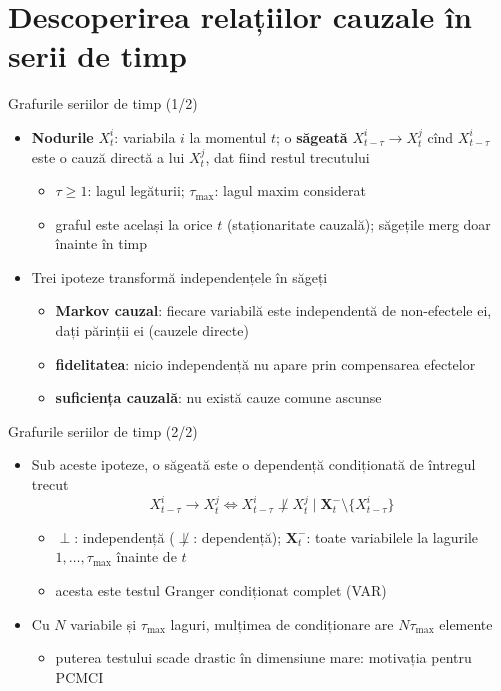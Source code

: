 \section{Descoperirea relațiilor cauzale în serii de timp}

\begin{frame}{Grafurile seriilor de timp (1/2)}
\itemsize{\small}
\begin{itemize}
    \item \textbf{Nodurile} $X^i_t$: variabila $i$ la momentul $t$; o \textbf{săgeată} $X^i_{t-\tau}\to X^j_t$ cînd $X^i_{t-\tau}$ este o cauză directă a lui $X^j_t$, dat fiind restul trecutului 
    \begin{itemize}
        \item $\tau \ge 1$: lagul legăturii; $\tau_{\max}$: lagul maxim considerat
        \item graful este același la orice $t$ (staționaritate cauzală); săgețile merg doar înainte în timp
    \end{itemize}
    \item Trei ipoteze transformă independențele în săgeți 
    \begin{itemize}
        \item \textbf{Markov cauzal}: fiecare variabilă este independentă de non-efectele ei, dați părinții ei (cauzele directe)
        \item \textbf{fidelitatea}: nicio independență nu apare prin compensarea efectelor
        \item \textbf{suficiența cauzală}: nu există cauze comune ascunse
    \end{itemize}
\end{itemize}
\end{frame}

\begin{frame}{Grafurile seriilor de timp (2/2)}
\itemsize{\small}
\begin{itemize}
    \item Sub aceste ipoteze, o săgeată este o dependență condiționată de întregul trecut \[ X^i_{t-\tau}\to X^j_t \iff X^i_{t-\tau} \not\perp X^j_t \mid \mathbf X^-_t\setminus\{X^i_{t-\tau}\} \]
    \begin{itemize}
        \item $\perp$: independență ($\not\perp$: dependență); $\mathbf X^-_t$: toate variabilele la lagurile $1, \dots, \tau_{\max}$ înainte de $t$
        \item acesta este testul Granger condiționat complet (VAR)
    \end{itemize}
    \item Cu $N$ variabile și $\tau_{\max}$ laguri, mulțimea de condiționare are $N\tau_{\max}$ elemente
    \begin{itemize}
        \item puterea testului scade drastic în dimensiune mare: motivația pentru PCMCI
    \end{itemize}
\end{itemize}
\end{frame}


